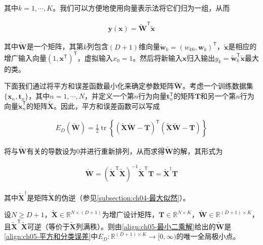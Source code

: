 \documentclass[../../main.tex]{subfiles}
\begin{document}
其中$k=1,\cdots,K$。我们可以方便地使用向量表示法将它们归为一组，从而

\begin{align}
  \boldsymbol{y}(\boldsymbol{x})=\tilde{\boldsymbol{W}}^{\mathsf{T}}\tilde{\boldsymbol{x}}
  \label{align:ch05-矩阵判别}
\end{align}

其中$\tilde{\boldsymbol{W}}$是一个矩阵，其第$k$列包含$(D+1)$维向量$\tilde{\boldsymbol{w}}_k=(w_{k0},\boldsymbol{w}_k)^{\mathsf{T}}$，$\tilde{\boldsymbol{x}}$是相应的增广输入向量$(1,\boldsymbol{x}^{\mathsf{T}})^{\mathsf{T}}$，虚拟输入$x_0=1$。然后将新输入$\boldsymbol{x}$归入输出$y_k=\tilde{\boldsymbol{w}}_k^{\mathsf{T}}\tilde{\boldsymbol{x}}$最大的类。

下面我们通过将平方和误差函数最小化来确定参数矩阵$\tilde{\boldsymbol{W}}$。考虑一个训练数据集$\{\boldsymbol{x}_n,\boldsymbol{t}_n\}$，其中$n=1,\cdots,N$，并定义一个第$n$行为向量$\boldsymbol{t}_n^{\mathsf{T}}$的矩阵$\boldsymbol{T}$和另一个第$n$行为向量$\tilde{\boldsymbol{x}}_n^{\mathsf{T}}$的矩阵$\tilde{\boldsymbol{X}}$。因此，平方和误差函数可以写成

\begin{align}
  E_D(\tilde{\boldsymbol{W}})=\frac{1}{2}\operatorname{tr}\left\{(\tilde{\boldsymbol{X}}\tilde{\boldsymbol{W}}-\boldsymbol{T})^{\mathsf{T}}(\tilde{\boldsymbol{X}}\tilde{\boldsymbol{W}}-\boldsymbol{T})\right\}
  \label{align:ch05-平方和分类误差}
\end{align}

将与$\tilde{\boldsymbol{W}}$有关的导数设为0并进行重新排列，从而求得$\tilde{\boldsymbol{W}}$的解，其形式为

\begin{align}
  \tilde{\boldsymbol{W}}=(\tilde{\boldsymbol{X}}^{\mathsf{T}}\tilde{\boldsymbol{X}})^{-1}\tilde{\boldsymbol{X}}^{\mathsf{T}}\boldsymbol{T}=\tilde{\boldsymbol{X}}^{\dagger}\boldsymbol{T}
  \label{align:ch05-最小二乘解}
\end{align}

其中$\tilde{\boldsymbol{X}}^{\dagger}$是矩阵$\tilde{\boldsymbol{X}}$的伪逆（参见\cref{subsection:ch04-最大似然}）。

\begin{proposition}[最小二乘分类解的极小性]\label{proposition:ch05-最小二乘极小性}
设$N\geqslant D+1$，$\tilde{\boldsymbol{X}}\in\mathbb{R}^{N\times(D+1)}$为增广设计矩阵，$\boldsymbol{T}\in\mathbb{R}^{N\times K}$，$\tilde{\boldsymbol{W}}\in\mathbb{R}^{(D+1)\times K}$，且$\tilde{\boldsymbol{X}}^{\mathsf{T}}\tilde{\boldsymbol{X}}$可逆（等价于$\tilde{\boldsymbol{X}}$列满秩）。则由\eqref{align:ch05-最小二乘解}给出的$\tilde{\boldsymbol{W}}$是\eqref{align:ch05-平方和分类误差}中$E_D:\mathbb{R}^{(D+1)\times K}\to[0,\infty)$的唯一全局极小点。
\end{proposition}
\end{document}

